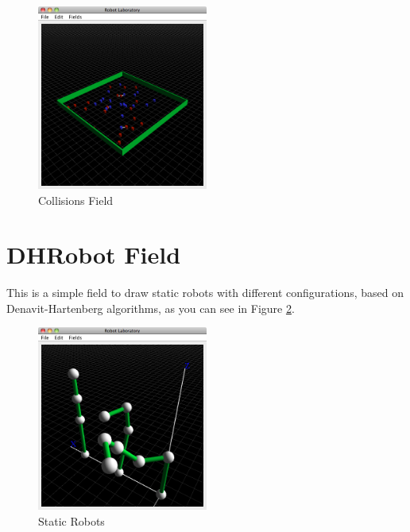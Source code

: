 \documentclass[12pt,a4paper,oneside,english]{book}
\begin{document}
\begin{figure}[htbp]
  \begin{center}
    \includegraphics[width=0.5\textwidth]{images/CF.png}
    \caption{Collisions Field}
    \label{collisions field}
  \end{center}
\end{figure}

\newpage
\section{DHRobot Field}

This is a simple field to draw static robots with different configurations, based on Denavit-Hartenberg algorithms, as you can see in Figure \ref{static robots}.

\begin{figure}[htbp]
  \begin{center}
    \includegraphics[width=0.5\textwidth]{images/SR.png}
    \caption{Static Robots}
    \label{static robots}
  \end{center}
\end{figure}

\newpage
\end{document}
